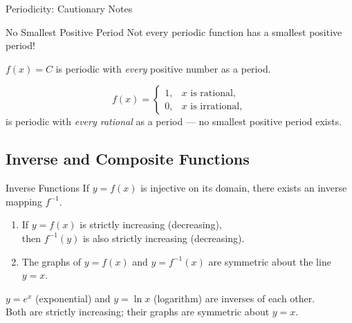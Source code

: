 \documentclass[aspectratio=169,10pt]{beamer}
\begin{document}
\begin{frame}{Periodicity: Cautionary Notes}
  \begin{alertblock}{No Smallest Positive Period}
    Not every periodic function has a smallest positive period!
  \end{alertblock}
  \pause
  \begin{example}
    $f(x)=C$ is periodic with \emph{every} positive number as a period.
  \end{example}
  \pause
  \begin{example}
    \[
      f(x) = \begin{cases}
        1, & x\text{ is rational},\\
        0, & x\text{ is irrational},
      \end{cases}
    \]
    is periodic with \emph{every rational} as a period --- no smallest positive period exists.
  \end{example}
\end{frame}

\subsection{Inverse and Composite Functions}

\begin{frame}{Inverse Functions}
  If $y=f(x)$ is injective on its domain, there exists an inverse mapping $f^{-1}$.
  \pause
  \begin{theorem}
    \begin{enumerate}
      \item<2-> If $y=f(x)$ is strictly increasing (decreasing),\\
            then $f^{-1}(y)$ is also strictly increasing (decreasing).
      \item<3-> The graphs of $y=f(x)$ and $y=f^{-1}(x)$ are symmetric about the line $y=x$.
    \end{enumerate}
  \end{theorem}
  \pause\pause
  \begin{example}
    $y=e^x$ (exponential) and $y=\ln x$ (logarithm) are inverses of each other.\\
    Both are strictly increasing; their graphs are symmetric about $y=x$.
  \end{example}
\end{frame}
\end{document}
